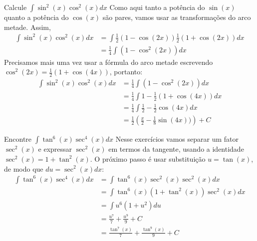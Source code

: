 \begin{example}
  Calcule \(\int \sin^2(x) \cos^2(x) dx\)
  \solution
  Como aqui tanto a potência do $\sin(x)$ quanto a potência
  do $\cos(x)$ são pares, vamos usar as transformações do arco metade.
  Assim,
  \begin{align*}
    \int \sin^2(x) \cos^2(x) dx
    & = \int \frac{1}{2}(1- \cos(2x)) \frac{1}{2}(1+ \cos(2x)) dx \\
    & = \frac{1}{4} \int (1- \cos^2(2x)) dx
  \end{align*}
  Precisamos mais uma vez usar a fórmula do arco metade escrevendo
  $\cos^2(2x)= \frac{1}{2}(1+ \cos(4x))$, portanto:
  \begin{align*}
    \int \sin^2(x) \cos^2(x) dx
    & = \frac{1}{4} \int (1- \cos^2(2x)) dx \\
    & = \frac{1}{4} \int 1-\frac{1}{2}(1+ \cos(4x))dx \\
    & = \frac{1}{4} \int   \frac{1}{2} - \frac{1}{2} \cos(4x) dx \\
    & = \frac{1}{2} \left( \frac{x}{2} - \frac{1}{8} \sin(4x))\right)+ C
  \end{align*}
\end{example}

\begin{example}
  Encontre \(\int \tan^6(x) \sec^4(x) dx\)
  \solution
  Nesse exercícios vamos separar um fator $\sec^2(x)$ e
  expressar $\sec^2(x)$ em termos da tangente, usando a identidade
  $\sec^2(x)=1+ \tan^2(x)$.
  O próximo passo é usar substituição
  $u=\tan(x)$, de modo que $du=\sec^2(x)dx$:
  \begin{align*}
    \int \tan^6(x) \sec^4(x) dx
    & = \int \tan^6(x) \sec^2(x)  \sec^2(x)dx  \\
    & = \int \tan^6(x) (1+ \tan^2(x))  \sec^2(x)dx \\
    & = \int u^6(1+u^2) du \\
    & = \frac{u^7}{7}+ \frac{u^9}{9}+ C \\
    & = \frac{\tan^7(x)}{7}+ \frac{\tan^9(x)}{9}+ C
  \end{align*}
\end{example}


